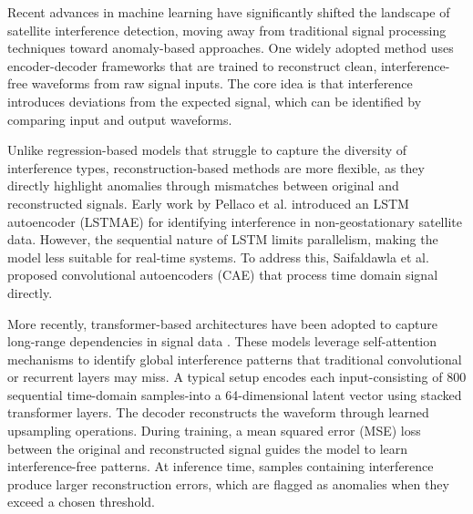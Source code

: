 \documentclass[conference]{IEEEtran}
\begin{document}

Recent advances in machine learning have significantly shifted the landscape of satellite interference detection, moving away from traditional signal processing techniques toward anomaly-based approaches. One widely adopted method uses encoder-decoder frameworks that are trained to reconstruct clean, interference-free waveforms from raw signal inputs. The core idea is that interference introduces deviations from the expected signal, which can be identified by comparing input and output waveforms.

Unlike regression-based models that struggle to capture the diversity of interference types, reconstruction-based methods are more flexible, as they directly highlight anomalies through mismatches between original and reconstructed signals. Early work by Pellaco et al. \cite{pellacoSpectrumPredictionInterference2019} introduced an LSTM autoencoder (LSTMAE) for identifying interference in non-geostationary satellite data. However, the sequential nature of LSTM limits parallelism, making the model less suitable for real-time systems. To address this, Saifaldawla et al. \cite{saifaldawlaConvolutionalAutoencodersNonGeostationary2024} proposed convolutional autoencoders (CAE) that process time domain signal directly.

More recently, transformer-based architectures have been adopted to capture long-range dependencies in signal data \cite{saifaldawlaGenAIBasedModelsNGSO2024}. These models leverage self-attention mechanisms to identify global interference patterns that traditional convolutional or recurrent layers may miss. A typical setup encodes each input-consisting of 800 sequential time-domain samples-into a 64-dimensional latent vector using stacked transformer layers. The decoder reconstructs the waveform through learned upsampling operations. During training, a mean squared error (MSE) loss between the original and reconstructed signal guides the model to learn interference-free patterns. At inference time, samples containing interference produce larger reconstruction errors, which are flagged as anomalies when they exceed a chosen threshold.
\end{document}
